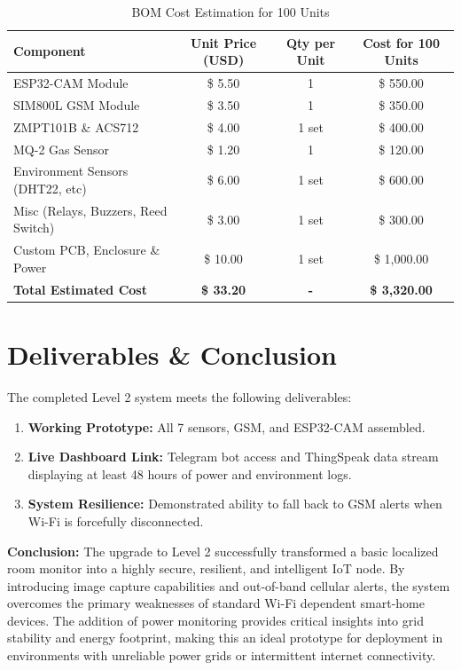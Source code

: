 \documentclass[12pt,a4paper]{article}
\begin{document}
\begin{table}[H]
\centering
\begin{tabular}{|l|c|c|c|}
\hline
\textbf{Component} & \textbf{Unit Price (USD)} & \textbf{Qty per Unit} & \textbf{Cost for 100 Units} \\ \hline
ESP32-CAM Module & \$ 5.50 & 1 & \$ 550.00 \\ \hline
SIM800L GSM Module & \$ 3.50 & 1 & \$ 350.00 \\ \hline
ZMPT101B \& ACS712 & \$ 4.00 & 1 set & \$ 400.00 \\ \hline
MQ-2 Gas Sensor & \$ 1.20 & 1 & \$ 120.00 \\ \hline
Environment Sensors (DHT22, etc) & \$ 6.00 & 1 set & \$ 600.00 \\ \hline
Misc (Relays, Buzzers, Reed Switch) & \$ 3.00 & 1 set & \$ 300.00 \\ \hline
Custom PCB, Enclosure \& Power & \$ 10.00 & 1 set & \$ 1,000.00 \\ \hline
\textbf{Total Estimated Cost} & \textbf{\$ 33.20} & \textbf{-} & \textbf{\$ 3,320.00} \\ \hline
\end{tabular}
\caption{BOM Cost Estimation for 100 Units}
\end{table}

\section{Deliverables \& Conclusion}
The completed Level 2 system meets the following deliverables:
\begin{enumerate}
    \item \textbf{Working Prototype:} All 7 sensors, GSM, and ESP32-CAM assembled.
    \item \textbf{Live Dashboard Link:} Telegram bot access and ThingSpeak data stream displaying at least 48 hours of power and environment logs.
    \item \textbf{System Resilience:} Demonstrated ability to fall back to GSM alerts when Wi-Fi is forcefully disconnected.
\end{enumerate}

\textbf{Conclusion:} 
The upgrade to Level 2 successfully transformed a basic localized room monitor into a highly secure, resilient, and intelligent IoT node. By introducing image capture capabilities and out-of-band cellular alerts, the system overcomes the primary weaknesses of standard Wi-Fi dependent smart-home devices. The addition of power monitoring provides critical insights into grid stability and energy footprint, making this an ideal prototype for deployment in environments with unreliable power grids or intermittent internet connectivity.
\end{document}
